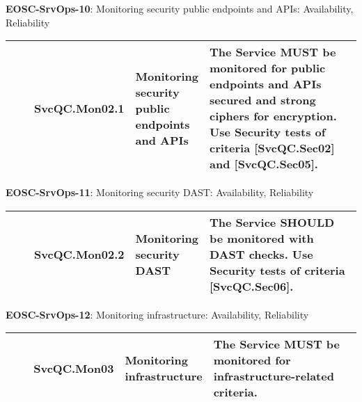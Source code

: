 \textbf{EOSC-SrvOps-10}: Monitoring security public endpoints and APIs: Availability, Reliability
\nopagebreak[4]
\begin{center}
    \tabletail{\hline}
    \tiny
    \begin{supertabular}{|p{0.10\linewidth}|p{0.10\linewidth}|p{0.20\linewidth}|p{0.60\linewidth}|} \hline
        \cite{orviz_fernandez_eosc-synergy_2020} & SvcQC.Mon02.1 & Monitoring security public endpoints and APIs & The Service MUST be monitored for public endpoints and APIs secured and strong ciphers for encryption. Use Security tests of criteria [SvcQC.Sec02] and [SvcQC.Sec05].\\ \hline
    \end{supertabular}
\end{center}

\textbf{EOSC-SrvOps-11}: Monitoring security DAST: Availability, Reliability
\nopagebreak[4]
\begin{center}
    \tabletail{\hline}
    \tiny
    \begin{supertabular}{|p{0.10\linewidth}|p{0.10\linewidth}|p{0.20\linewidth}|p{0.60\linewidth}|} \hline
        \cite{orviz_fernandez_eosc-synergy_2020} & SvcQC.Mon02.2 & Monitoring security DAST & The Service SHOULD be monitored with DAST checks. Use Security tests of criteria [SvcQC.Sec06].\\ \hline
    \end{supertabular}
\end{center}

\textbf{EOSC-SrvOps-12}: Monitoring infrastructure: Availability, Reliability
\nopagebreak[4]
\begin{center}
    \tabletail{\hline}
    \tiny
    \begin{supertabular}{|p{0.10\linewidth}|p{0.10\linewidth}|p{0.20\linewidth}|p{0.60\linewidth}|} \hline
        \cite{orviz_fernandez_eosc-synergy_2020} & SvcQC.Mon03 & Monitoring infrastructure & The Service MUST be monitored for infrastructure-related criteria.\\ \hline
    \end{supertabular}
\end{center}

